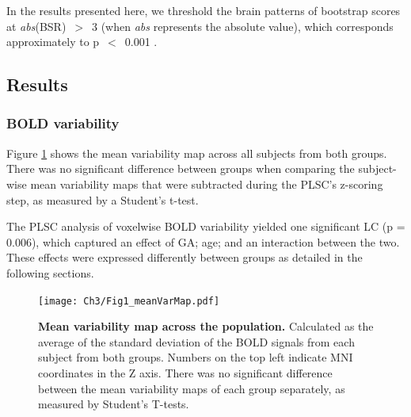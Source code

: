 In the results presented here, we threshold the brain patterns of bootstrap scores at \textit{abs}(BSR)~$>$~3 (when \textit{abs} represents the absolute value), which corresponds approximately to p~$<$~0.001 \citep{Garrett2013}. 

\subsection{Results}

\subsubsection{BOLD variability}
Figure \ref{fig:meanVarMap} shows the mean variability map across all subjects from both groups. There was no significant difference between groups when comparing the subject-wise mean variability maps that were subtracted during the PLSC's z-scoring step, as measured by a Student's t-test.

The PLSC analysis of voxelwise BOLD variability yielded one significant LC (p = 0.006), which captured an effect of GA; age; and an interaction between the two. These effects were expressed differently between groups as detailed in the following sections. 


\begin{figure}[h] 
\centering\texttt{[image: Ch3/Fig1\_meanVarMap.pdf]}
\caption{\textbf{Mean variability map across the population. }  Calculated as the average of the standard deviation of the BOLD signals from each subject from both groups. Numbers on the top left indicate MNI coordinates in the Z axis. There was no significant difference between the mean variability maps of each group separately, as measured by Student's T-tests.}\label{fig:meanVarMap}
\end{figure}


